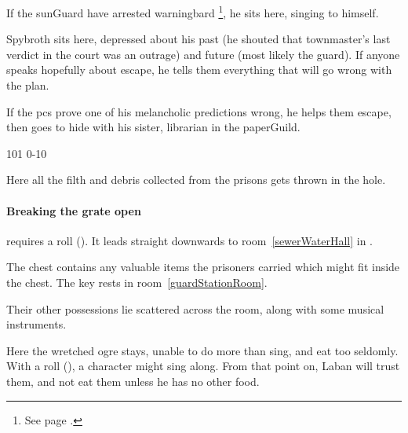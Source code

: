 \begin{multicols}{2}


If the \gls{sunGuard} have arrested \gls{warningbard}%
\footnote{See page \pageref{warningbard}.},
he sits here, singing to himself.


Spybroth sits here, depressed about his past (he shouted that \gls{townmaster}'s last verdict in the \gls{court} was an outrage) and future (most likely the \gls{guard}).
If anyone speaks hopefully about escape, he tells them everything that will go wrong with the plan.

If the \glspl{pc} prove one of his melancholic predictions wrong, he helps them escape, then goes to hide with his sister, \gls{librarian} in the \gls{paperGuild}.


%
  {{1}{0}{1}}%
  {{0}{-1}{0}}%
  {%
  }%
  {}%
  {\lootSmall}%
  {}%

\label{spyBroth}


Here all the filth and debris collected from the prisons gets thrown in the hole.

\paragraph{Breaking the grate open}
requires a  roll (\tn[10]).
It leads straight downwards to room~\vref{sewerWaterHall} in .


The chest contains any valuable items the prisoners carried which might fit inside the chest.
The key rests in room~\ref{guardStationRoom}.

Their other possessions lie scattered across the room, along with some musical instruments.


Here the wretched ogre stays, unable to do more than sing, and eat too seldomly.
With a  roll (\tn[12]), a character might sing along.
From that point on, Laban will trust them, and not eat them unless he has no other food.


\end{multicols}
